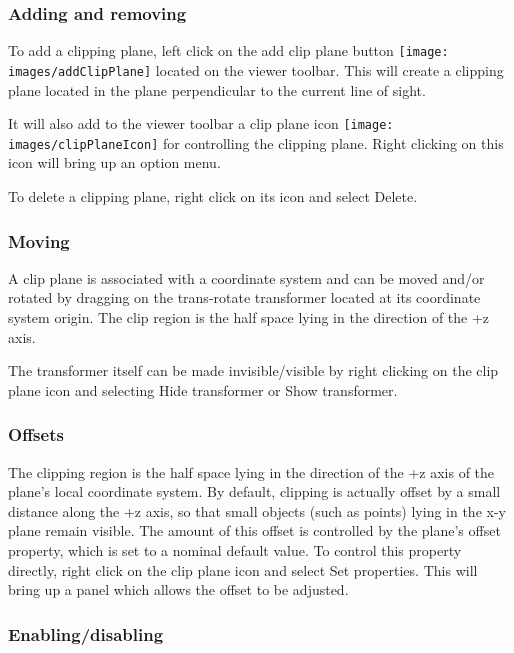 \documentclass{article}
\begin{document}
\subsubsection{Adding and removing}

To add a clipping plane, left click on the {\sf add clip plane}
button \texttt{[image: images/addClipPlane]} located on the
viewer toolbar. This will create a clipping plane located in the plane
perpendicular to the current line of sight.

It will also add to the viewer toolbar a {\sf clip plane} icon
\texttt{[image: images/clipPlaneIcon]} for controlling the
clipping plane.  Right clicking on this icon will bring up an option
menu.

To delete a clipping plane, right click on its icon and
select {\sf Delete}.

\subsubsection{Moving}

A clip plane is associated with a coordinate system and can be moved
and/or rotated by dragging on the trans-rotate transformer located at
its coordinate system origin. The clip region is the half space lying
in the direction of the +z axis.

The transformer itself can be made invisible/visible by right clicking
on the clip plane icon and selecting {\sf Hide transformer} or {\sf Show
transformer}.

\subsubsection{Offsets}

The clipping region is the half space lying in the direction of the +z
axis of the plane's local coordinate system. By default, clipping is
actually offset by a small distance along the +z axis, so that small
objects (such as points) lying in the x-y plane remain
visible. The amount of this offset is controlled by the plane's
{\sf offset} property, which is set to a nominal default value. To control
this property directly, right click on the clip plane icon and select
{\sf Set properties}. This will bring up a panel which allows the offset
to be adjusted.

\subsubsection{Enabling/disabling}
\end{document}
